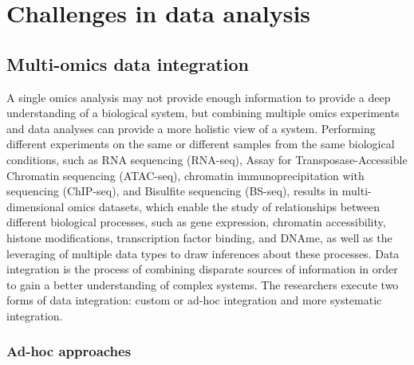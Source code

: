 \documentclass[12pt,twoside]{reedthesis}
\begin{document}
\hypertarget{section-1}{%
\subsection*{}\label{section-1}}

\hypertarget{challenges-in-data-analysis}{%
\section*{Challenges in data analysis}\label{challenges-in-data-analysis}}

\hypertarget{multi-omics-data-integration}{%
\subsection*{Multi-omics data integration}\label{multi-omics-data-integration}}

A single omics analysis may not provide enough information to provide a
deep understanding of a biological system, but combining multiple omics
experiments and data analyses can provide a more holistic view of a
system. Performing different experiments on the same or different
samples from the same biological conditions, such as RNA sequencing
(RNA-seq), Assay for Transposase-Accessible Chromatin sequencing
(ATAC-seq), chromatin immunoprecipitation with sequencing (ChIP-seq),
and Bisulfite sequencing (BS-seq), results in multi-dimensional omics
datasets, which enable the study of relationships between different
biological processes, such as gene expression, chromatin accessibility,
histone modifications, transcription factor binding, and DNAme, as well
as the leveraging of multiple data types to draw inferences about these
processes. Data integration is the process of combining disparate
sources of information in order to gain a better understanding of
complex systems. The researchers execute two forms of data integration:
custom or ad-hoc integration and more systematic integration.

\hypertarget{ad-hoc-approaches}{%
\subsubsection*{Ad-hoc approaches}\label{ad-hoc-approaches}}
\end{document}
